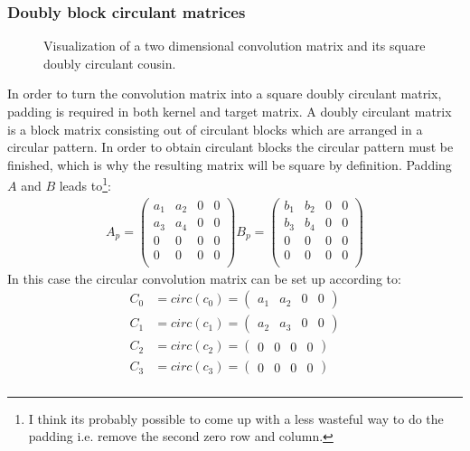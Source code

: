 \documentclass{article}
\begin{document}
\subsubsection{Doubly block circulant matrices}
\begin{figure}


\caption{Visualization of a two dimensional convolution matrix and its square doubly circulant cousin.}
\label{fig:2dconv}
\end{figure}
In order to turn the convolution matrix into a square doubly circulant matrix, padding is required in both kernel and target matrix. A doubly circulant matrix is a block matrix consisting out of circulant blocks which are arranged in a circular pattern. In order to obtain circulant blocks the circular pattern must be finished, which is why the resulting matrix will be square by definition.
Padding $A$ and $B$ leads to\footnote{I think its probably possible to come up with a less wasteful way to do the padding i.e. remove the second zero row and column.}:
\begin{align}
A_p = \begin{pmatrix}
a_1 & a_2 & 0 & 0 \\
a_3 & a_4 & 0 & 0 \\
0 & 0 & 0 & 0 \\
0 & 0 & 0 & 0 \\
\end{pmatrix}
B_p = \begin{pmatrix}
b_1 & b_2 & 0 & 0 \\
b_3 & b_4 & 0 & 0 \\
0 & 0 & 0 & 0 \\
0 & 0 & 0 & 0 \\
\end{pmatrix}
\end{align}
In this case the circular convolution matrix can be set up according to:
\begin{align}
C_0 &= circ(c_0) = \begin{pmatrix} a_1 & a_2 & 0 & 0 \end{pmatrix} \\
C_1 &= circ(c_1) = \begin{pmatrix} a_2 & a_3 & 0 & 0 \end{pmatrix} \\
C_2 &= circ(c_2) = \begin{pmatrix} 0 & 0 & 0 & 0 \end{pmatrix} \\
C_3 &= circ(c_3) = \begin{pmatrix} 0 & 0 & 0 & 0 \end{pmatrix} \\
\end{align}
\end{document}
